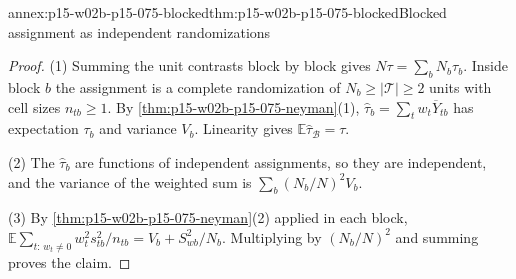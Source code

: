 \begin{annexitem}{annex:p15-w02b-p15-075-blocked}{thm:p15-w02b-p15-075-blocked}{Blocked assignment as independent randomizations}
\begin{proof}
(1) Summing the unit contrasts block by block gives
\(N\tau=\sum_bN_b\tau_b\). Inside block \(b\) the assignment is a complete
randomization of \(N_b\geq|\mathcal T|\geq2\) units with cell sizes
\(n_{tb}\geq1\). By \cref{thm:p15-w02b-p15-075-neyman}(1),
\(\widehat\tau_b=\sum_tw_t\overline Y_{tb}\) has expectation \(\tau_b\) and
variance \(V_b\). Linearity gives \(\mathbb E\widehat\tau_{\mathcal B}=\tau\).

(2) The \(\widehat\tau_b\) are functions of independent assignments, so they
are independent, and the variance of the weighted sum is
\(\sum_b(N_b/N)^2V_b\).

(3) By \cref{thm:p15-w02b-p15-075-neyman}(2) applied in each block,
\(\mathbb E\sum_{t:\,w_t\neq0}w_t^2s_{tb}^2/n_{tb}=V_b+S_{wb}^2/N_b\).
Multiplying by \((N_b/N)^2\) and summing proves the claim.
\end{proof}
\end{annexitem}

